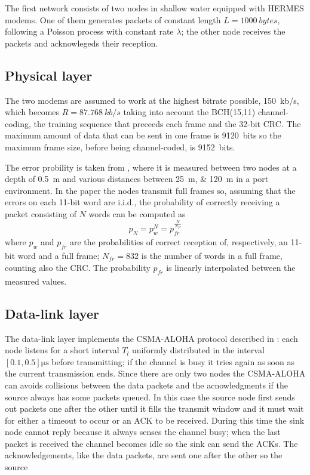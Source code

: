 The first network consists of two nodes in shallow water equipped with
HERMES modems. One of them generates packets of constant length
$L=\SI{1000}{bytes}$, following a Poisson process with constant rate
$\lambda$; the other node receives the packets and acknowlegeds their
reception.

\subsection{Physical layer}
The two modems are assumed to work at the highest bitrate possible,
\SI{150}{kb/s}, which becomes $R = \SI{87.768}{kb/s}$ taking into
account the BCH(15,11) channel-coding, the training sequence that
preceeds each frame and the 32-bit CRC.
%
The maximum amount of data that can be sent in one frame
is \SI{9120}{bits} so the maximum frame size, before being
channel-coded, is \SI{9152}{bits}.

The error probility is taken from \cite{hermes}, where it is measured
between two nodes at a depth of \SI{0.5}{\m} and various distances
between \SIlist{25; 120}{\m} in a port environment. In the paper the
nodes transmit full frames so, assuming that the errors on each 11-bit
word are i.i.d., the probability of correctly receiving a packet
consisting of $N$ words can be computed as
\begin{equation}
  p_N = p_w^N = p_{\mathit{fr}}^\frac{N}{N_{\mathit{fr}}}
  \label{eq:pN}
\end{equation}
where $p_w$ and $p_{\mathit{fr}}$ are the probabilities of correct
reception of, respectively, an 11-bit word and a full frame;
$N_{\mathit{fr}} = 832$ is the number of words in a full frame,
counting also the CRC.
%
The probability $p_{\mathit{fr}}$ is linearly interpolated between the
measured values.

\subsection{Data-link layer}
The data-link layer implements the CSMA-ALOHA protocol described
in \cite{proto_issues}: each node listens for a short interval $T_l$
uniformly distributed in the interval $[0.1,0.5]\si{\micro\s}$ before
transmitting; if the channel is busy it tries again as soon as the
current transmission ends.
%
Since there are only two nodes the CSMA-ALOHA can avoids collisions
between the data packets and the acnowledgments if the source always
has some packets queued.
%
In this case the source node first sends out packets one after the
other until it fills the transmit window and it must wait for either a
timeout to occur or an ACK to be received. During this time the sink
node cannot reply because it always senses the channel busy; when the
last packet is received the channel becomes idle so the sink can send
the ACKs. The acknowledgements, like the data packets, are sent one
after the other so the source 


